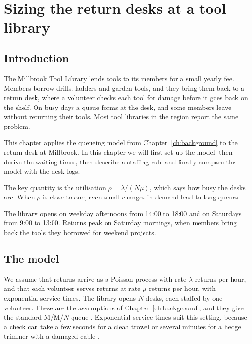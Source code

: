 \chapter{Sizing the return desks at a tool library}
\label{ch:desks}

\section{Introduction}
\label{sec:intro}

The Millbrook Tool Library lends tools to its members for a small yearly fee.
Members borrow drills, ladders and garden tools, and they bring them back to a return desk, where a volunteer checks each tool for damage before it goes back on the shelf.
On busy days a queue forms at the desk, and some members leave without returning their tools.
Most tool libraries in the region report the same problem.

This chapter applies the queueing model from Chapter~\ref{ch:background} to the return desk at Millbrook.
In this chapter we will first set up the model, then derive the waiting times, then describe a staffing rule and finally compare the model with the desk logs.

The key quantity is the utilisation $\rho = \lambda/(N\mu)$, which says how busy the desks are.
When $\rho$ is close to one, even small changes in demand lead to long queues.

The library opens on weekday afternoons from 14:00 to 18:00 and on Saturdays from 9:00 to 13:00.
Returns peak on Saturday mornings, when members bring back the tools they borrowed for weekend projects.

\section{The model}
\label{sec:model}

We assume that returns arrive as a Poisson process with rate $\lambda$ returns per hour, and that each volunteer serves returns at rate $\mu$ returns per hour, with exponential service times.
The library opens $N$ desks, each staffed by one volunteer.
These are the assumptions of Chapter~\ref{ch:background}, and they give the standard M/M/$N$ queue \cite{example2021}.
Exponential service times suit this setting, because a check can take a few seconds for a clean trowel or several minutes for a hedge trimmer with a damaged cable \cite{sample2019}.


